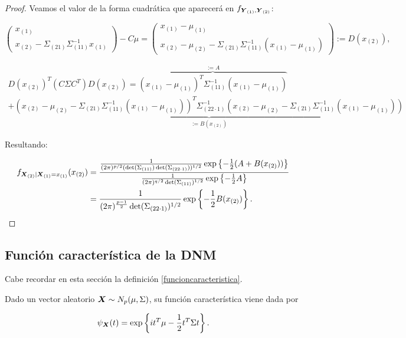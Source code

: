 \begin{proof}
  Veamos el valor de la forma cuadrática que aparecerá en $f_{\boldsymbol{Y}_{(1)}, \boldsymbol{Y}_{(2)}}$:

  \[
     \left(
     \begin{array}{c}
       x_{(1)} \\ \hline
       x_{(2)} - \Sigma_{(21)}\Sigma_{(11)}^{-1}x_{(1)}
     \end{array}
     \right) - C\mu = \left(
     \begin{array}{c}
       x_{(1)} - \mu_{(1)} \\ \hline
       x_{(2)} - \mu_{(2)} - \Sigma_{(21)}\Sigma_{(11)}^{-1}(x_{(1)} - \mu_{(1)})
     \end{array}
     \right) := D(x_{(2)}),
   \]

   \[
   \begin{split}
     D(x_{(2)})^T (C\Sigma C^T) D(x_{(2)}) = \overbrace{(x_{(1)} - \mu_{(1)})^T \Sigma_{(11)}^{-1} (x_{(1)} - \mu_{(1)})}^{:= A} \\
     + \underbrace{(x_{(2)} - \mu_{(2)} - \Sigma_{(21)}\Sigma_{(11)}^{-1}(x_{(1)} - \mu_{(1)}))^T \Sigma_{(22\cdot 1)}^{-1}
       (x_{(2)} - \mu_{(2)} - \Sigma_{(21)}\Sigma_{(11)}^{-1}(x_{(1)} - \mu_{(1)}))}_{:= B(x_{(2)})}
   \end{split}
   \]  

   Resultando:

   \[
   \begin{split}
     f_{\boldsymbol{X}_{(2)} | \boldsymbol{X}_{(1)} = x_{(1)}}(x_{(2)}) & = \frac{ \frac{1}{(2\pi)^{p/2} (\det(\Sigma_{(11)})\det(\Sigma_{(22\cdot 1)}))^{1/2}} \exp\left\{ -\frac{1}{2} (A + B(x_{(2)}))  \right\} }
     { \frac{1}{(2\pi)^{q/2} \det(\Sigma_{(11)})^{1/2}} \exp\left\{ -\frac{1}{2} A \right\} } \\
     & = \frac{1}{(2\pi)^{\frac{p-1}{2}} \det(\Sigma_{(22\cdot 1)})^{1/2}} \exp\left\{ -\frac{1}{2} B(x_{(2)}) \right\}.
   \end{split}
   \]
  \end{proof}



  \subsection{Función característica de la DNM}

  Cabe recordar en esta sección la definición \ref{funcioncaracteristica}.

  \begin{nprop} \label{posvar:car-ii}
    Dado un vector aleatorio $\boldsymbol{X} \sim N_p(\mu, \Sigma)$, su función característica viene dada por
    
    \[
      \psi_{\boldsymbol{X}}(t) = \exp\left\{ it^T\mu - \frac{1}{2} t^T \Sigma t \right\}
    .\]
  \end{nprop}

